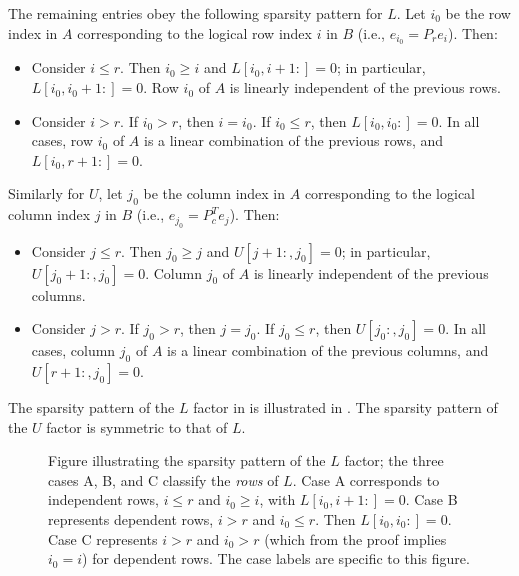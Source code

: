 \documentclass[final]{siamart1116}
\numberwithin{theorem}{section}
\begin{document}
\begin{theorem}
  The remaining entries obey the following sparsity pattern for $L$. Let $i_0$ be the row index in $A$ corresponding to the logical row index $i$ in $B$ (i.e., $e_{i_0} = P_r e_i$). Then:
  \begin{itemize}
    \item Consider $i \le r$. Then $i_0 \ge i$ and $L[i_0, i+1:] = 0$; in particular, $L[i_0, i_0+1:] = 0$. Row $i_0$ of $A$ is linearly independent of the previous rows.
    \item Consider $i > r$. If $i_0 > r$, then $i = i_0$. If $i_0 \le r$, then $L[i_0, i_0:] = 0$. In all cases, row $i_0$ of $A$ is a linear combination of the previous rows, and $L[i_0, r+1:] = 0$.
  \end{itemize}
  Similarly for $U$, let $j_0$ be the column index in $A$ corresponding to the logical column index $j$ in $B$ (i.e., $e_{j_0} = P_c^T e_j$). Then:
  \begin{itemize}
    \item Consider $j \le r$. Then $j_0 \ge j$ and $U[j+1:, j_0] = 0$; in particular, $U[j_0+1:, j_0] = 0$. Column $j_0$ of $A$ is linearly independent of the previous columns.
    \item Consider $j > r$. If $j_0 > r$, then $j = j_0$. If $j_0 \le r$, then $U[j_0:, j_0] = 0$. In all cases, column $j_0$ of $A$ is a linear combination of the previous columns, and $U[r+1:, j_0] = 0$.
  \end{itemize}
\end{theorem}

The sparsity pattern of the $L$ factor in  is illustrated in . The sparsity pattern of the $U$ factor is symmetric to that of $L$.

\begin{figure}
  \centering
  
  \caption{Figure illustrating the sparsity pattern of the $L$ factor; the three cases A, B, and C classify the \emph{rows} of $L$. Case A corresponds to independent rows, $i \le r$ and $i_0 \ge i$, with $L[i_0, i+1:] = 0$. Case B represents dependent rows, $i > r$ and $i_0 \le r$. Then $L[i_0, i_0:] = 0$. Case C represents $i > r$ and $i_0 > r$ (which from the proof implies $i_0 = i$) for dependent rows. The case labels are specific to this figure.}
  \label{fig:sparsity}
\end{figure}
\end{document}
